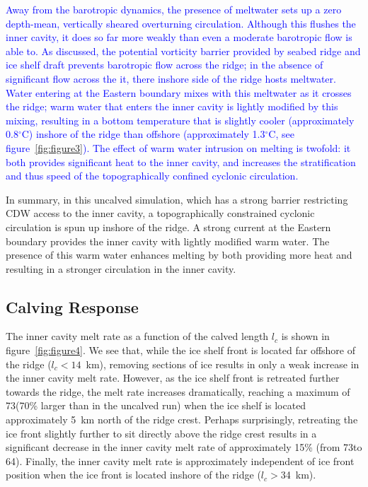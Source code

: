 \documentclass[draft]{agujournal2019}
\newcommand{\blue}[1]{\textcolor{blue}{#1}}
\begin{document}
\blue{Away from the barotropic dynamics, the presence of meltwater sets up a zero depth-mean, vertically sheared overturning circulation. Although this flushes the inner cavity, it does so far more weakly than even a moderate barotropic flow is able to. As discussed, the potential vorticity barrier provided by seabed ridge and ice shelf draft prevents barotropic flow across the ridge; in the absence of significant flow across the it, there inshore side of the ridge hosts meltwater. Water entering at the Eastern boundary mixes with this meltwater as it crosses the ridge; warm water that enters the inner cavity is lightly modified by this mixing, resulting in a bottom temperature that is slightly cooler (approximately 0.8${}^\circ$C) inshore of the ridge than offshore (approximately 1.3${}^\circ$C, see figure~\ref{fig:figure3}). The effect of warm water intrusion on melting is twofold: it both provides significant heat to the inner cavity, and increases the stratification and thus speed of the topographically confined cyclonic circulation.}

In summary, in this uncalved simulation, which has a strong barrier restricting CDW access to the inner cavity, a topographically constrained cyclonic circulation is spun up inshore of the ridge. A strong current at the Eastern boundary provides the inner cavity with lightly modified warm water. The presence of this warm water enhances melting by both providing more heat and resulting in a stronger circulation in the inner cavity.


\subsection{Calving Response}
The inner cavity melt rate as a function of the calved length $l_c$ is shown in figure~\ref{fig:figure4}. We see that, while the ice shelf front is located far offshore of the ridge ($l_c < 14$~km), removing sections of ice results in only a weak increase in the inner cavity melt rate. However, as the ice shelf front is retreated further towards the ridge, the melt rate increases dramatically, reaching a maximum of 73\mpryr (70\% larger than in the uncalved run) when the ice shelf is located approximately 5~km north of the ridge crest. Perhaps surprisingly, retreating the ice front slightly further to sit directly above the ridge crest results in a significant decrease in the inner cavity melt rate of approximately 15\% (from 73\mpryr to 64\mpryr). Finally, the inner cavity melt rate is approximately independent of ice front position when the ice front is located inshore of the ridge ($l_c>$34~km).
\end{document}

